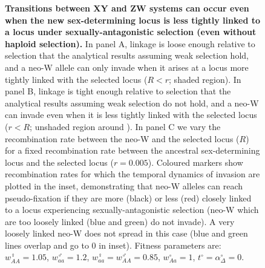 \documentclass[10pt,letterpaper]{article}
\begin{document}
\begin{figure}[!h]
\centering
\caption{
{\bf Transitions between XY and ZW systems can occur even when the new sex-determining locus is less tightly linked to a locus under sexually-antagonistic selection (even without haploid selection).}
In panel A, linkage is loose enough relative to selection that the analytical results assuming weak selection hold, and a neo-W allele can only invade when it arises at a locus more tightly linked with the selected locus ($R<r$; shaded region).
In panel B, linkage is tight enough relative to selection that the analytical results assuming weak selection do not hold, and a neo-W can invade even when it is less tightly linked with the selected locus ($r<R$; unshaded region around \text{*}).
In panel C we vary the recombination rate between the neo-W and the selected locus ($R$) for a fixed recombination rate between the ancestral sex-determining locus and the selected locus ($r=0.005$). 
Coloured markers show recombination rates for which the temporal dynamics of invasion are plotted in the inset, demonstrating that neo-W alleles can reach pseudo-fixation if they are more (black) or less (red) closely linked to a locus experiencing sexually-antagonistic selection (neo-W which are too loosely linked (blue and green) do not invade). 
A very loosely linked neo-W does not spread in this case (blue and green lines overlap and go to 0 in inset). 
Fitness parameters are: $w_{AA}^\female = 1.05$, $w_{aa}^\male = 1.2$, $w_{aa}^\female = w_{AA}^\male = 0.85$, $w_{Aa}^\circ = 1$,  $t^\circ = \alpha^\circ_\Delta = 0$.
}
\label{fig:SexAntagTighter}
\end{figure}
\end{document}
